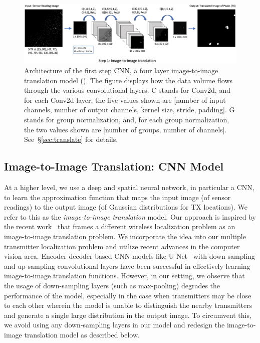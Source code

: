 \begin{figure}
    \centering
    \includegraphics[width=\textwidth]{chapters/wowmom-pmc/figures/part1.png}
    \caption{Architecture of the first step CNN, a four layer image-to-image translation model (\imgimg). The figure displays how the data volume flows through the various convolutional layers. C stands for Conv2d, and for each Conv2d layer, the five values shown are [number of input channels, number of output channels, kernel size, stride, padding]. G stands for group normalization, and, for each group normalization, the two values shown are [number of groups, number of channels]. See~\S\ref{sec:translate} for details.}
    \label{fig:part1}
\end{figure}


\subsection{\bf Image-to-Image Translation: \imgimg CNN Model}
\label{subsec:img-translate}

At a higher level, we use a deep and spatial neural network, in particular a CNN, to learn the
approximation function that maps the input image (of sensor readings) to the output image (of Gaussian distributions for TX locations). We refer to this as the {\em image-to-image translation}
model. Our approach is inspired by the recent work~\cite{mobicom20-deeploc} that frames 
a different wireless localization problem as an image-to-image translation problem.
We incorporate the idea into our multiple transmitter localization problem and utilize recent advances in the computer vision area. 
Encoder-decoder based CNN models like U-Net~\cite{miccai15-unet} with down-sampling
and up-sampling convolutional layers have been successful in effectively learning image-to-image translation functions. However, in our setting, we observe that the usage of down-sampling layers (such as max-pooling) degrades the performance of the model, especially in the case when transmitters may be close to each other wherein the model is unable to distinguish the nearby transmitters and generate a single large distribution in the output image. To circumvent this, we avoid using any
down-sampling layers in our model and redesign the image-to-image translation model as described below.

